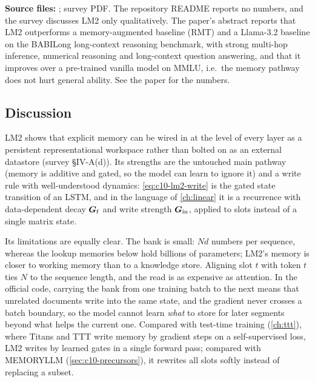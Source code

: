 \begin{results}
\textbf{Source files:} ; survey PDF.
The repository README reports no numbers, and the survey discusses LM2 only qualitatively. The
paper's abstract reports that LM2 outperforms a memory-augmented baseline (RMT) and a Llama-3.2
baseline on the BABILong long-context reasoning benchmark, with strong multi-hop inference,
numerical reasoning and long-context question answering, and that it improves over a pre-trained
vanilla model on MMLU, i.e.\ the memory pathway does not hurt general ability. See the paper for
the numbers.
\end{results}

\subsection{Discussion}

LM2 shows that explicit memory can be wired in at the level of every layer as a persistent
representational workspace rather than bolted on as an external datastore (survey \S IV-A(d)).
Its strengths are the untouched main pathway (memory is additive and gated, so the model can learn
to ignore it) and a write rule with well-understood dynamics: \cref{eq:c10-lm2-write} is the gated
state transition of an LSTM, and in the language of \cref{ch:linear} it is a recurrence with
data-dependent decay $\bm{G}_{\mathrm{f}}$ and write strength $\bm{G}_{\mathrm{in}}$, applied to slots
instead of a single matrix state.

Its limitations are equally clear. The bank is small: $N d$ numbers per sequence, whereas the
lookup memories below hold billions of parameters; LM2's memory is closer to working memory than
to a knowledge store. Aligning slot $t$ with token $t$ ties $N$ to the sequence length, and the read
is as expensive as attention. In the official code, carrying the bank from one training batch to
the next means that unrelated documents write into the same state, and the gradient never crosses
a batch boundary, so the model cannot learn \emph{what} to store for later segments beyond what
helps the current one. Compared with test-time training (\cref{ch:ttt}), where Titans and TTT
write memory by gradient steps on a self-supervised loss, LM2 writes by learned gates in a single
forward pass; compared with MEMORYLLM (\cref{sec:c10-precursors}), it rewrites all slots softly
instead of replacing a subset.

